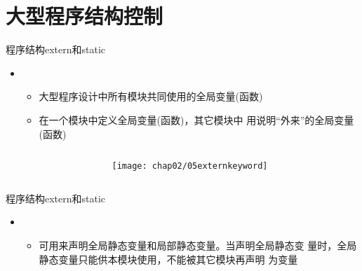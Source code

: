 \section[程序结构]{大型程序结构控制}\label{sec:chap02-sec07}
\begin{frame}[fragile]{程序结构}{extern和static}
  \begin{itemize}  
  \item {}    
    \begin{itemize}
      \tiny
    \item 大型程序设计中所有模块共同使用的全局变量(函数)
    \item 在一个模块中定义全局变量(函数)，其它模块中
      用说明``外来''的全局变量(函数)
    \end{itemize}
  \end{itemize}
  \vspace{-4.5ex}
  \begin{columns}
    \centering
    \begin{column}{0.42\textwidth}
      \centering
      \vspace{-6ex}
    \end{column}
    \begin{column}{0.42\textwidth}
      \centering
      \texttt{[image: chap02/05externkeyword]}
    \end{column}
  \end{columns}
\end{frame}

\begin{frame}[fragile]{程序结构}{extern和static}
  \begin{itemize}  
  \item {}    
    \begin{itemize}
      \tiny
    \item {}可用来声明全局静态变量和局部静态变量。当声明全局静态变
      量时，全局静态变量只能供本模块使用，不能被其它模块再声明
      为变量
    \end{itemize}
  \end{itemize}
  \begin{center}
    \begin{minipage}{0.4\linewidth}
    \end{minipage}\qquad
    \begin{minipage}{0.4\linewidth}
    \end{minipage}
  \end{center}
\end{frame}

